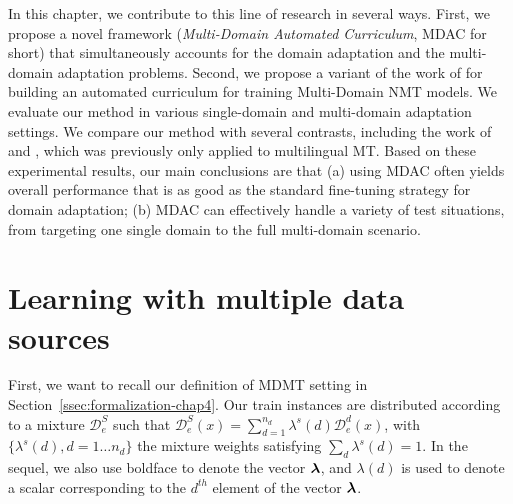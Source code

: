 In this chapter, we contribute to this line of research in several ways. First, we propose a novel framework (\emph{Multi-Domain Automated Curriculum}, MDAC for short) that simultaneously accounts for the domain adaptation and the multi-domain adaptation problems. Second, we propose a variant of the work of \cite{Wang20balancing} for building an automated curriculum for training Multi-Domain NMT models. We evaluate our method in various single-domain and multi-domain adaptation settings. We compare our method with several contrasts, including the work of \citet{Zhang19curriculum} and \citet{Wang20balancing}, which was previously only applied to multilingual MT. Based on these experimental results, our main conclusions are that (a) using MDAC often yields overall performance that is as good as the standard fine-tuning strategy for domain adaptation; (b) MDAC can effectively handle a variety of test situations, from targeting one single domain to the full multi-domain scenario. 

\section{Learning with multiple data sources} \label{sec:mdmt-chap7}
First, we want to recall our definition of MDMT setting in Section~\ref{ssec:formalization-chap4}. Our train instances are distributed according to a mixture $\mathcal{D}_e^S$ such that $\mathcal{D}_e^S(x) = \sum_{d=1}^{n_d} \lambda^{s}(d) \mathcal{D}^d_e(x)$, with $\{\lambda^{s}(d), d=1 \dots n_d\}$ the mixture weights satisfying $\sum_d \lambda^{s}(d)=1$. In the sequel, we also use boldface to denote the vector $\bm{\lambda}$, and $\lambda(d)$ is used to denote a scalar corresponding to the $d^{th}$ element of the vector $\bm{\lambda}$.


